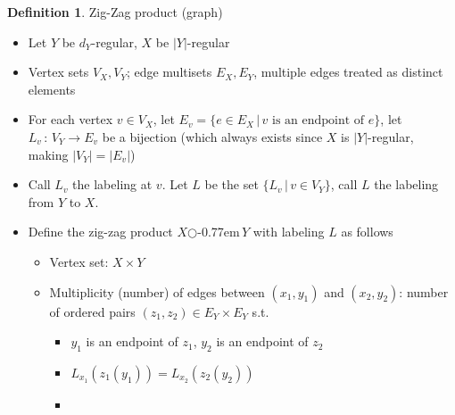 \documentclass{book}
\newcommand{\zigzag}{$\bigcirc$\kern-0.77em\raisebox{-.16ex}{\small Z}$\,$}
\newcommand{\abs}[1]{\lvert #1 \rvert }
\theoremstyle{definition}
\newtheorem{definition}[lemma]{Definition}
\theoremstyle{remarkstyle}
\begin{document}
\begin{definition}
Zig-Zag product (graph)
\begin{itemize}
    \item Let $Y$ be $d_Y$-regular, $X$ be $\abs{Y}$-regular
    \item Vertex sets $V_X, V_Y$; edge multisets $E_X, E_Y$, multiple edges treated as distinct elements
    \item For each vertex $v\in V_X $, let $E_v = \{e\in E_X \, \lvert \, v \textrm{ is an endpoint of } e \} $, let $L_v \, : \, V_{Y}\rightarrow E_v $ be a bijection (which always exists since $X$ is $\abs{Y}$-regular, making $\abs{V_Y}=\abs{E_v}$)
    \item Call $L_v$ the labeling at $v$. Let $L$ be the set $\{L_v\,\lvert\, v\in V_Y\}$, call $L$ the labeling from $Y$ to $X$.
    \item Define the zig-zag product $X$\zigzag$Y$ with labeling $L$ as follows
    \begin{itemize}
        \item Vertex set: $X\times Y$
        \item Multiplicity (number) of edges between $(x_1,y_1)$ and $(x_2,y_2)$: number of ordered pairs $(z_1,z_2)\in E_Y\times E_Y$ s.t. 
        \begin{itemize}
            \item[1.] $y_1$ is an endpoint of $z_1$, $y_2$ is an endpoint of $z_2$
            \item[2.] $L_{x_1}(z_1(y_1)) = L_{x_2}(z_2(y_2)) $ 
            \item[] 
        \end{itemize}
    \end{itemize}
\end{itemize}
\end{definition}
\end{document}
